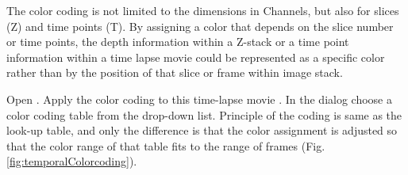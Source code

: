 The color coding is not limited to the dimensions in Channels, but also for slices (Z) and time points (T). By assigning a color that depends on the slice number or time points, the depth information within a Z-stack or a time point information within a time lapse movie could be represented as a specific color rather than by the position of that slice or frame within image stack.


\begin{indentexercise}{1}
Open . Apply the color coding to this time-lapse movie . In the dialog choose a color coding table from the drop-down list. Principle of the coding is same as the look-up table, and only the difference is that the color assignment is adjusted so that the color range of that table fits to the range of frames (Fig. \ref{fig:temporalColorcoding}). 



\end{indentexercise}
